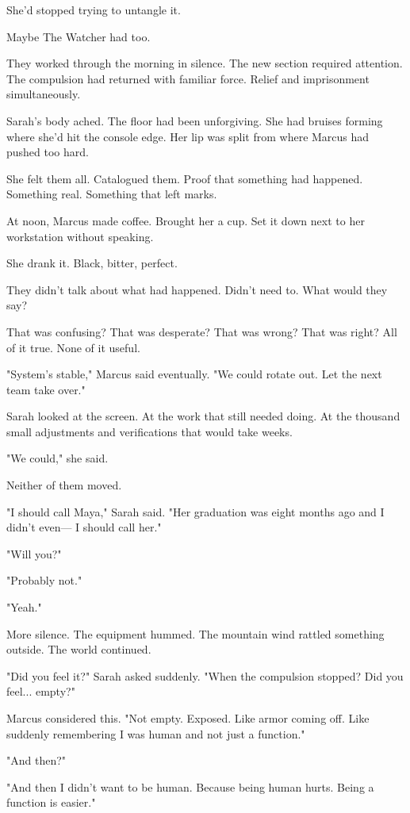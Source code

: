 She'd stopped trying to untangle it.

Maybe The Watcher had too.

\scenebreak

They worked through the morning in silence. The new section required attention. The compulsion had returned with familiar force. Relief and imprisonment simultaneously.

Sarah's body ached. The floor had been unforgiving. She had bruises forming where she'd hit the console edge. Her lip was split from where Marcus had pushed too hard.

She felt them all. Catalogued them. Proof that something had happened. Something real. Something that left marks.

At noon, Marcus made coffee. Brought her a cup. Set it down next to her workstation without speaking.

She drank it. Black, bitter, perfect.

They didn't talk about what had happened. Didn't need to. What would they say?

That was confusing?
That was desperate?
That was wrong?
That was right?
All of it true. None of it useful.

"System's stable," Marcus said eventually. "We could rotate out. Let the next team take over."

Sarah looked at the screen. At the work that still needed doing. At the thousand small adjustments and verifications that would take weeks.

"We could," she said.

Neither of them moved.

"I should call Maya," Sarah said. "Her graduation was eight months ago and I didn't even— I should call her."

"Will you?"

"Probably not."

"Yeah."

More silence. The equipment hummed. The mountain wind rattled something outside. The world continued.

"Did you feel it?" Sarah asked suddenly. "When the compulsion stopped? Did you feel... empty?"

Marcus considered this. "Not empty. Exposed. Like armor coming off. Like suddenly remembering I was human and not just a function."

"And then?"

"And then I didn't want to be human. Because being human hurts. Being a function is easier."


